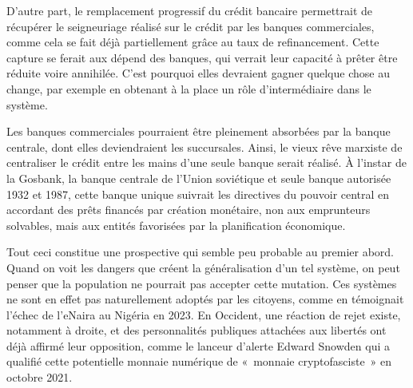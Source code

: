 D'autre part, le remplacement progressif du crédit bancaire permettrait de récupérer le seigneuriage réalisé sur le crédit par les banques commerciales, comme cela se fait déjà partiellement grâce au taux de refinancement. Cette capture se ferait aux dépend des banques, qui verrait leur capacité à prêter être réduite voire annihilée. C'est pourquoi elles devraient gagner quelque chose au change, par exemple en obtenant à la place un rôle d'intermédiaire dans le système.

Les banques commerciales pourraient être pleinement absorbées par la banque centrale, dont elles deviendraient les succursales. Ainsi, le vieux rêve marxiste de centraliser le crédit entre les mains d'une seule banque serait réalisé. À l'instar de la Gosbank, la banque centrale de l'Union soviétique et seule banque autorisée 1932 et 1987, cette banque unique suivrait les directives du pouvoir central en accordant des prêts financés par création monétaire, non aux emprunteurs solvables, mais aux entités favorisées par la planification économique.


Tout ceci constitue une prospective qui semble peu probable au premier abord. Quand on voit les dangers que créent la généralisation d'un tel système, on peut penser que la population ne pourrait pas accepter cette mutation. Ces systèmes ne sont en effet pas naturellement adoptés par les citoyens, comme en témoignait l'échec de l'eNaira au Nigéria en 2023. En Occident, une réaction de rejet existe, notamment à droite, et des personnalités publiques attachées aux libertés ont déjà affirmé leur opposition, comme le lanceur d'alerte Edward Snowden qui a qualifié cette potentielle monnaie numérique de «~monnaie cryptofasciste~» en octobre 2021.

